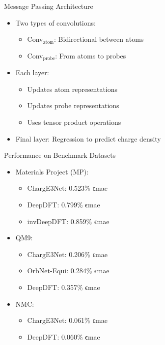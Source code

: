 \begin{frame}{Message Passing Architecture}
    \begin{itemize}
        \item Two types of convolutions:
        \begin{itemize}
            \item Conv$_{\text{atom}}$: Bidirectional between atoms
            \item Conv$_{\text{probe}}$: From atoms to probes
        \end{itemize}
        \item Each layer:
        \begin{itemize}
            \item Updates atom representations
            \item Updates probe representations
            \item Uses tensor product operations
        \end{itemize}
        \item Final layer: Regression to predict charge density
    \end{itemize}
\end{frame}

\begin{frame}{Performance on Benchmark Datasets}
    \begin{itemize}
        \item Materials Project (MP):
        \begin{itemize}
            \item ChargE3Net: 0.523\% ϵmae
            \item DeepDFT: 0.799\% ϵmae
            \item invDeepDFT: 0.859\% ϵmae
        \end{itemize}
        \item QM9:
        \begin{itemize}
            \item ChargE3Net: 0.206\% ϵmae
            \item OrbNet-Equi: 0.284\% ϵmae
            \item DeepDFT: 0.357\% ϵmae
        \end{itemize}
        \item NMC:
        \begin{itemize}
            \item ChargE3Net: 0.061\% ϵmae
            \item DeepDFT: 0.060\% ϵmae
        \end{itemize}
    \end{itemize}
\end{frame}

